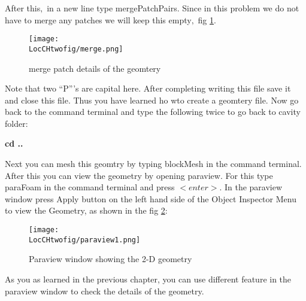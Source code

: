 \flushleft After this$,$ in a new line type mergePatchPairs. Since in this problem we do not have to merge any patches we will keep this empty$,$ fig \ref{merge}.
\vspace{0.32cm}
\begin{figure}[ht]  
\begin{center}  
\texttt{[image: \\LocCHtwofig/merge.png]}
\caption{merge patch details of the geomtery}
\label{merge}
\end{center}  
\end{figure}

\flushleft Note that two “P”'s are capital here.
\flushleft After completing writing this file save it and close this file. Thus you have learned ho wto create a geomtery file.
\flushleft Now go back to the command terminal and type the following twice to go back to cavity folder:

\center \textbf{cd ..} 

\flushleft Next you can mesh this geomtry by typing blockMesh in the command terminal. After this you can view the geometry by opening paraview. For this type paraFoam in the command terminal and press $<enter>$.
\flushleft In the paraview window press Apply button on the left hand side of the Object Inspector Menu to
view the Geometry, as shown in the fig \ref{paraview1}:
\begin{figure}[ht]  
\begin{center}  
\texttt{[image: \\LocCHtwofig/paraview1.png]}
\caption{Paraview window showing the 2-D geometry}
\label{paraview1}
\end{center}  
\end{figure}

\flushleft As you as learned in the previous chapter, you can use different feature in the paraview window to check the details of the geometry.
